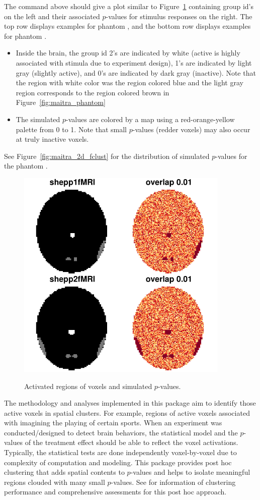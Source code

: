 The command above should give a plot similar to Figure~\ref{fig:maitra_2d}
containing group id's on the left and their associated
$p$-values for stimulus responses on the right.
The top row displays examples for phantom , and the
bottom row displays examples for phantom .
\begin{itemize}
\item
Inside the brain,
the group id 2's are indicated by white (active is highly associated with
stimula due to experiment design),
1's are indicated by light gray (slightly active),
and 0's are indicated by dark gray (inactive).
Note that the region with white color was the region colored  blue
and the light gray region corresponds to the region colored brown in
Figure~\ref{fig:maitra_phantom} 
\item
The simulated $p$-values are colored by a map using  a
red-orange-yellow palette from 0 to 1.
Note that small $p$-values (redder voxels) may also occur at truly inactive voxels.
\end{itemize}
See Figure~\ref{fig:maitra_2d_fclust} for the distribution of
simulated $p$-values for the phantom .

\begin{figure}[h]
\caption{Activated regions of voxels and simulated $p$-values.}
\centering
\vspace{0.2cm}
\includegraphics[width=4in]{./MixfMRI-include/maitra_2d}
\label{fig:maitra_2d}
\end{figure}

The methodology and analyses implemented in this package aim to 
identify those active voxels in spatial clusters. For example,
regions of active voxels associated with imagining the playing of certain
sports. 
When an experiment was conducted/designed to detect brain behaviors,
the statistical model and the $p$-values of the treatment effect
should be able to reflect the voxel activations.
Typically, the statistical tests are done independently voxel-by-voxel
due to complexity of computation and modeling.
This package provides post hoc clustering that adds spatial contents
to $p$-values and helps to isolate meaningful regions
clouded with many small $p$-values.
See \cite{ChenMaitra2021} for information of clustering performance and
comprehensive assessments for this post hoc approach.


